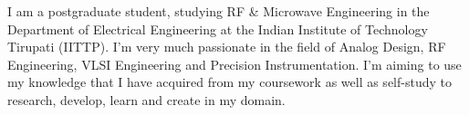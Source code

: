 

\begin{cvparagraph}

I am a postgraduate student, studying RF \& Microwave Engineering in the Department of Electrical Engineering at the Indian Institute of Technology Tirupati (IITTP). I’m very much passionate in the field of Analog Design, RF Engineering, VLSI Engineering and Precision Instrumentation. I’m aiming to use my knowledge that I have acquired from my coursework as well as self-study to research, develop, learn and create in my domain.
\end{cvparagraph}